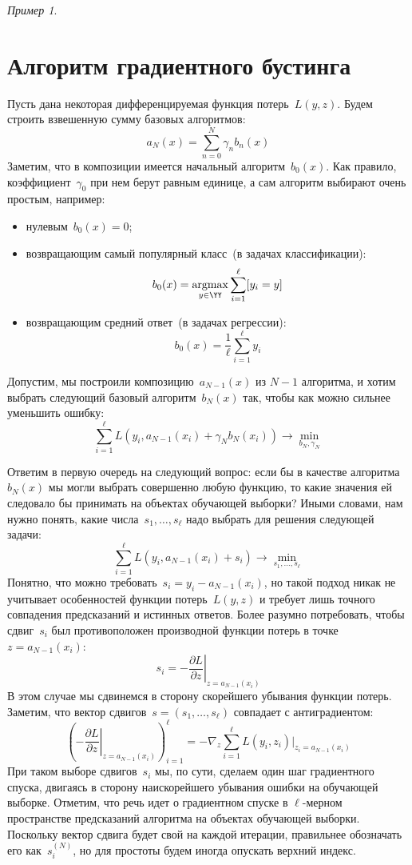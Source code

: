\documentclass[a4paper, 12pt]{article}
\DeclareMathOperator{\argmax}{argmax }
\theoremstyle{plain} %
\theoremstyle{definition} %
\theoremstyle{remark} %
\newtheorem{example}{Пример}
\begin{document}
\begin{example}
\section{Алгоритм градиентного бустинга}

Пусть дана некоторая дифференцируемая функция потерь~$L(y, z)$.
Будем строить взвешенную сумму базовых алгоритмов:
\[
    a_N(x)
    =
    \sum_{n = 0}^{N}
        \gamma_n b_n(x)
\]
Заметим, что в композиции имеется начальный алгоритм~$b_0(x)$.
Как правило, коэффициент~$\gamma_0$ при нем берут равным единице,
а сам алгоритм выбирают очень простым, например:
\begin{itemize}
    \item нулевым~$b_0(x) = 0$;
    \item возвращающим самый популярный класс~(в задачах классификации):
        \[
            b_0(x) = \argmax_{y \in \YY} \sum_{i = 1}^{\ell} [y_i = y]
        \]
    \item возвращающим средний ответ~(в задачах регрессии):
        \[
            b_0(x) = \frac{1}{\ell} \sum_{i = 1}^{\ell} y_i
        \]
\end{itemize}

Допустим, мы построили композицию~$a_{N - 1}(x)$ из $N - 1$ алгоритма,
и хотим выбрать следующий базовый алгоритм~$b_N(x)$ так, чтобы как можно сильнее
уменьшить ошибку:
\[
    \sum_{i = 1}^{\ell}
        L(y_i, a_{N - 1}(x_i) + \gamma_N b_N(x_i))
    \to
    \min_{b_N, \gamma_N}
\]

Ответим в первую очередь на следующий вопрос: если бы в качестве алгоритма~$b_N(x)$ мы
могли выбрать совершенно любую функцию, то какие значения ей следовало бы принимать
на объектах обучающей выборки? Иными словами, нам нужно понять, какие числа~$s_1, \dots, s_\ell$
надо выбрать для решения следующей задачи:
\[
    \sum_{i = 1}^{\ell}
        L(y_i, a_{N - 1}(x_i) + s_i)
    \to
    \min_{s_1, \dots, s_\ell}
\]
Понятно, что можно требовать~$s_i = y_i - a_{N - 1}(x_i)$,
но такой подход никак не учитывает особенностей функции потерь~$L(y, z)$
и требует лишь точного совпадения предсказаний и истинных ответов.
Более разумно потребовать, чтобы сдвиг~$s_i$ был противоположен производной функции потерь
в точке~$z = a_{N - 1}(x_i)$:
\[
    s_i
    =
    -
    \left.
    \frac{\partial L}{\partial z}
    \right|_{z = a_{N - 1}(x_i)}
\]
В этом случае мы сдвинемся в сторону скорейшего убывания функции потерь.
Заметим, что вектор сдвигов~$s = (s_1, \dots, s_\ell)$ совпадает
с антиградиентом:
\[
    \left(
        -\left.
        \frac{\partial L}{\partial z}
        \right|_{z = a_{N - 1}(x_i)}
    \right)_{i = 1}^{\ell}
    =
    -\nabla_z
    \sum_{i = 1}^{\ell}
        L(y_i, z_i)
    \big|_{z_i = a_{N - 1}(x_i)}
\]
При таком выборе сдвигов~$s_i$ мы, по сути, сделаем один шаг градиентного спуска,
двигаясь в сторону наискорейшего убывания ошибки на обучающей выборке.
Отметим, что речь идет о градиентном спуске в $\ell$-мерном пространстве предсказаний алгоритма
на объектах обучающей выборки.
Поскольку вектор сдвига будет свой на каждой итерации, правильнее обозначать его как~$s_i^{(N)}$,
но для простоты будем иногда опускать верхний индекс.


\end{example}
\end{document}
